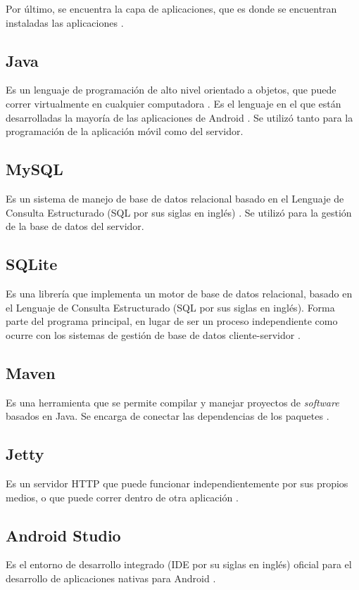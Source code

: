 Por último, se encuentra la capa de aplicaciones, que es donde se encuentran instaladas las aplicaciones \cite{AND3}.

\subsection{Java}
Es un lenguaje de programación de alto nivel orientado a objetos, que puede correr virtualmente en cualquier computadora \cite{JAV1}. Es el lenguaje en el que están desarrolladas la mayoría de las aplicaciones de Android \cite{AND2}. Se utilizó tanto para la programación de la aplicación móvil como del servidor.

\subsection{MySQL} 
Es un sistema de manejo de base de datos relacional basado en el Lenguaje de Consulta Estructurado (SQL por sus siglas en inglés) \cite{SQL1}. Se utilizó para la gestión de la base de datos del servidor.

\subsection{SQLite}
Es una librería que implementa un motor de base de datos relacional, basado en el Lenguaje de Consulta Estructurado (SQL por sus siglas en inglés). Forma parte del programa principal, en lugar de ser un proceso independiente como ocurre con los sistemas de gestión de base de datos cliente-servidor \cite{SQL2}.

\subsection{Maven}
Es una herramienta que se permite compilar y  manejar proyectos de \textit{software} basados en Java. Se encarga de conectar las dependencias de los paquetes \cite{MVN1}.

\subsection{Jetty}
Es un servidor HTTP que puede funcionar independientemente por sus propios medios, o que puede correr dentro de otra aplicación \cite{JTY1}.

\subsection{Android Studio}
Es el entorno de desarrollo integrado (IDE por su siglas en inglés) oficial para el desarrollo de aplicaciones nativas para Android \cite{ASD1}.

